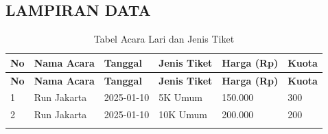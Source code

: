 
\begin{landscape}
    
\chapter*{LAMPIRAN DATA}

\begin{longtable}{|p{}|p{}|p{}|p{}|p{}|p{}|}
\hline
\textbf{No} & \textbf{Nama Acara} & \textbf{Tanggal} & \textbf{Jenis Tiket} & \textbf{Harga (Rp)} & \textbf{Kuota} \\ \hline
\endfirsthead

\hline
\textbf{No} & \textbf{Nama Acara} & \textbf{Tanggal} & \textbf{Jenis Tiket} & \textbf{Harga (Rp)} & \textbf{Kuota} \\ \hline
\endhead

\hline
\endfoot

\endlastfoot

1 & Run Jakarta & 2025-01-10 & 5K Umum & 150.000 & 300 \\
2 & Run Jakarta & 2025-01-10 & 10K Umum & 200.000 & 200 \\

\caption{Tabel Acara Lari dan Jenis Tiket}
\end{longtable}

\end{landscape}
    
